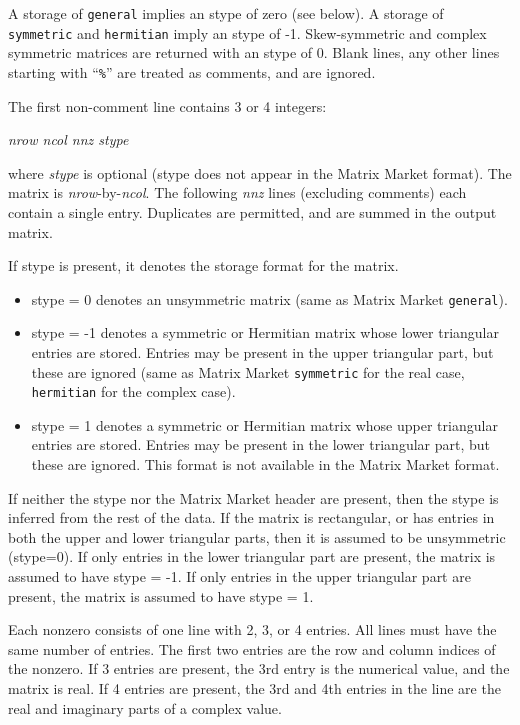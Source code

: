 \documentclass[11pt]{article}
\begin{document}
A storage of {\tt general} implies an stype of zero
(see below).  A storage of {\tt symmetric} and {\tt hermitian} imply an stype of -1.
Skew-symmetric and complex symmetric matrices are returned with an stype of 0.
Blank lines, any other lines starting with ``{\tt \%}'' are treated as comments, and are ignored.

The first non-comment line contains 3 or 4 integers:
\vspace{0.1in}

	{\em nrow ncol nnz stype}

\vspace{0.1in}
\noindent
where {\em stype} is optional (stype does not appear in the Matrix Market format).
The matrix is {\em nrow}-by-{\em ncol}.  The following {\em nnz} lines (excluding comments)
each contain a single entry.  Duplicates are permitted, and are summed in
the output matrix.

If stype is present, it denotes the storage format for the matrix.
\begin{itemize}
\item stype = 0 denotes an unsymmetric matrix (same as Matrix Market {\tt general}).
\item stype = -1 denotes a symmetric or Hermitian matrix whose lower triangular 
	entries are stored.  Entries may be present in the upper triangular
	part, but these are ignored (same as Matrix Market {\tt symmetric}
	for the real case, {\tt hermitian} for the complex case).
\item stype = 1 denotes a symmetric or Hermitian matrix whose upper triangular 
	entries are stored.  Entries may be present in the lower triangular
	part, but these are ignored.  This format is not available in the Matrix
	Market format.
\end{itemize}

If neither the stype nor the Matrix Market header are present, then
the stype is inferred from the rest of the data.  If the matrix is
rectangular, or has
entries in both the upper and lower triangular parts, then it is assumed to
be unsymmetric (stype=0).  If only entries in the lower triangular part are
present, the matrix is assumed to have stype = -1.  If only entries in the
upper triangular part are present, the matrix is assumed to have stype = 1.

Each nonzero consists of one line with 2, 3, or 4 entries.  All lines must
have the same number of entries.  The first two entries are the row and
column indices of the nonzero.  If 3 entries are present, the 3rd entry is
the numerical value, and the matrix is real.  If 4 entries are present,
the 3rd and 4th entries in the line are the real and imaginary parts of
a complex value.
\end{document}
